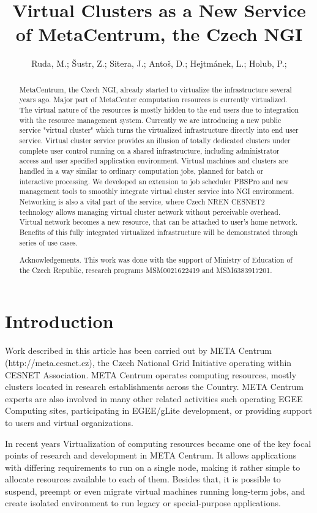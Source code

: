 \documentclass{article}
\title {Virtual Clusters as a New Service of MetaCentrum, the Czech NGI}
\author{Ruda, M.;
\v Sustr, Z.;
Sitera, J.;
Anto\v s, D.;
Hejtm\' anek, L.;
Holub, P.;}
\institute{CESNET}
\begin{document}
\maketitle

\begin{abstract}
MetaCentrum, the Czech NGI, already started to virtualize the infrastructure several years ago. Major
part of MetaCenter computation resources is currently virtualized. The virtual nature of the resources
is mostly hidden to the end users due to integration with the resource management system. Currently
we are introducing a new public service "virtual cluster" which turns the virtualized infrastructure
directly into end user service. Virtual cluster service provides an illusion of totally dedicated clusters
under complete user control running on a shared infrastructure, including administrator access and
user specified application environment. Virtual machines and clusters are handled in a way similar to
ordinary computation jobs, planned for batch or interactive processing. We developed an extension to
job scheduler PBSPro and new management tools to smoothly integrate virtual cluster service into
NGI environment. Networking is also a vital part of the service, where Czech NREN CESNET2
technology allows managing virtual cluster network without perceivable overhead. Virtual network
becomes a new resource, that can be attached to user's home network. Benefits of this fully integrated
virtualized infrastructure will be demonstrated through series of use cases.

\medskip

Acknowledgements. This work was done with the support of Ministry of Education of the Czech
Republic, research programs MSM0021622419 and MSM6383917201.
\end{abstract}

\section{Introduction}
Work described in this article has been carried out by META Centrum (http://meta.cesnet.cz), the Czech National Grid Initiative operating within CESNET Association. META Centrum operates computing resources, mostly clusters located in research establishments across the Country. META Centrum experts are also involved in many other related activities such operating EGEE Computing sites, participating in EGEE/gLite development, or providing support to users and virtual organizations.

In recent years Virtualization of computing resources became one of the key focal points of research and development in META Centrum. It allows applications with differing requirements to run on a single node, making it rather simple to allocate resources available to each of them. Besides that, it is possible to suspend, preempt or even migrate virtual machines running long-term jobs, and create isolated environment to run legacy or special-purpose applications.
\end{document}
